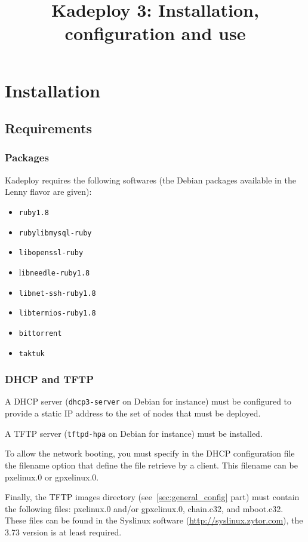 \documentclass[a4wide,10pt,oneside]{book}
\title{Kadeploy 3: Installation, configuration and use}
\begin{document}
\maketitle

\tableofcontents


\chapter{Installation}
\section{Requirements}
\subsection{Packages}
Kadeploy requires the following softwares (the Debian packages available in the Lenny flavor are given):
\begin{itemize}
\item \texttt{ruby1.8}
\item \texttt{rubylibmysql-ruby}
\item \texttt{libopenssl-ruby}
\item l\texttt{ibneedle-ruby1.8}
\item \texttt{libnet-ssh-ruby1.8}
\item \texttt{libtermios-ruby1.8}
\item \texttt{bittorrent}
\item \texttt{taktuk}
\end{itemize}

\subsection{DHCP and TFTP}
A DHCP server (\texttt{dhcp3-server} on Debian for instance) must be configured to provide a static IP address to the set of nodes that must be deployed.

A TFTP server (\texttt{tftpd-hpa} on Debian for instance) must be installed.

To allow the network booting, you must specify in the DHCP configuration file the filename option that define the file retrieve by a client. This filename can be pxelinux.0 or gpxelinux.0.

Finally, the TFTP images directory (see~\ref{sec:general_config} part) must contain the following files: pxelinux.0 and/or gpxelinux.0, chain.c32, and mboot.c32. These files can be found in the Syslinux software (\url{http://syslinux.zytor.com}), the 3.73 version is at least required.
\end{document}
